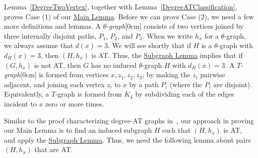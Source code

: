 \documentclass[12pt]{article}
\theoremstyle{plain}
\theoremstyle{definition}
\theoremstyle{remark}
\newcommand{\aside}[1]{\marginnote{\scriptsize{#1}}[0cm]}
\begin{document}
	Lemma~\ref{DegreeTwoVertex}, together with Lemma~\ref{DegreeATClassification},
	proves Case (1) of our \hyperlink{target:mainLemma}{Main Lemma}.  Before we can prove Case
	(2), we need a few more definitions and lemmas.
	A \emph{$\theta$-graph}\aside{$\theta$-graph} consists of two vertices joined by
	three internally disjoint paths, $P_1$, $P_2$, and $P_3$.  When we write $h_x$
	for a $\theta$-graph, we always assume that $d(x)=3$.  We will see
	shortly that if $H$ is a $\theta$-graph with $d_H(x)=3$, then $(H,h_x)$ is AT.
	Thus, the \hyperlink{target:InducedSubgraph}{Subgraph Lemma} implies that 
	if $(G,h_x)$ is not AT, then $G$ has no induced $\theta$-graph $H$ with $d_H(x)=3$. 
	A \emph{$T$-graph}\aside{$T$-graph} is formed from vertices $x, z_1, z_2, z_3$,
	by making the $z_i$ 
	pairwise adjacent, and joining each vertex $z_i$ to $x$ by a path $P_i$ (where
	the $P_i$ are disjoint).  Equivalently, a $T$-graph is formed from $K_4$ by
	subdividing each of the edges incident to $x$ zero or more times.
	
	Similar to the proof characterizing degree-AT graphs in~\cite{HKS},
	our approach in proving our Main Lemma is to find an induced subgraph $H$ such
	that $(H,h_x)$ is AT, and apply the \hyperlink{target:InducedSubgraph}{Subgraph Lemma}.
	Thus, we need the following lemma about pairs $(H,h_x)$ that are AT.
	
\end{document}
